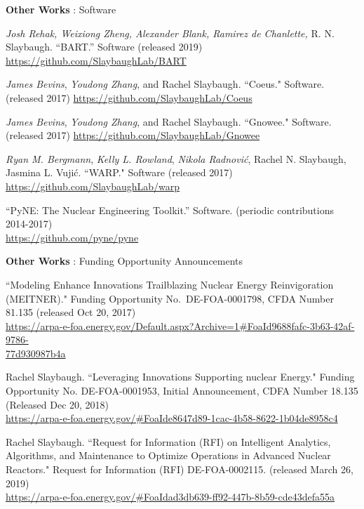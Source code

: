 \begin{bibsection}
\item \textbf{Other Works} : Software
\item \textit{Josh Rehak, Weixiong Zheng, Alexander Blank, Ramirez de Chanlette,} R. N. Slaybaugh. “BART.” Software (released 2019) \\
\url{https://github.com/SlaybaughLab/BART}

\item \textit{James Bevins}, \textit{Youdong Zhang}, and Rachel Slaybaugh. ``Coeus." Software. (released 2017) \url{https://github.com/SlaybaughLab/Coeus} 

\item \textit{James Bevins}, \textit{Youdong Zhang}, and Rachel Slaybaugh. ``Gnowee." Software. (released 2017) \url{https://github.com/SlaybaughLab/Gnowee} 

\item \textit{Ryan M. Bergmann}, \textit{Kelly L. Rowland}, \textit{Nikola Radnovi\'c}, Rachel N. Slaybaugh, Jasmina L. Vuji\'c. ``WARP." Software (released 2017) \url{https://github.com/SlaybaughLab/warp}

\item “PyNE: The Nuclear Engineering Toolkit.” Software. (periodic contributions 2014-2017) \\
\url{https://github.com/pyne/pyne}

\item \textbf{Other Works} : Funding Opportunity Announcements
\item ``Modeling Enhance Innovations Trailblazing Nuclear Energy Reinvigoration (MEITNER)." Funding Opportunity No.\ DE-FOA-0001798, CFDA Number 81.135 (released Oct 20, 2017)\\
\url{https://arpa-e-foa.energy.gov/Default.aspx?Archive=1#FoaId9688fafc-3b63-42af-9786-}\\ \url{77d930987b4a}

\item Rachel Slaybaugh. ``Leveraging Innovations Supporting nuclear Energy." Funding Opportunity No. DE-FOA-0001953, Initial Announcement, CDFA Number 18.135 (Released Dec 20, 2018)\\
\url{https://arpa-e-foa.energy.gov/#FoaIde8647d89-1cac-4b58-8622-1b04de8958c4}

\item Rachel Slaybaugh. ``Request for Information (RFI) on Intelligent Analytics, Algorithms, and Maintenance to Optimize Operations in Advanced Nuclear Reactors." Request for Information (RFI) DE-FOA-0002115. (released March 26, 2019)\\
\url{https://arpa-e-foa.energy.gov/#FoaIdad3db639-ff92-447b-8b59-cde43defa55a}


\end{bibsection}

